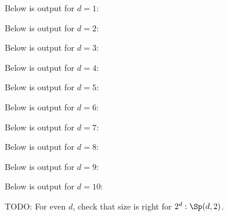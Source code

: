 

Below is output for $d = 1$:



Below is output for $d = 2$:



Below is output for $d = 3$:



Below is output for $d = 4$:



Below is output for $d = 5$:



Below is output for $d = 6$:



Below is output for $d = 7$:



Below is output for $d = 8$:



Below is output for $d = 9$:



Below is output for $d = 10$:



TODO: For even $d$, check that size is right for $2^d : \Sp(d,2)$.

% 